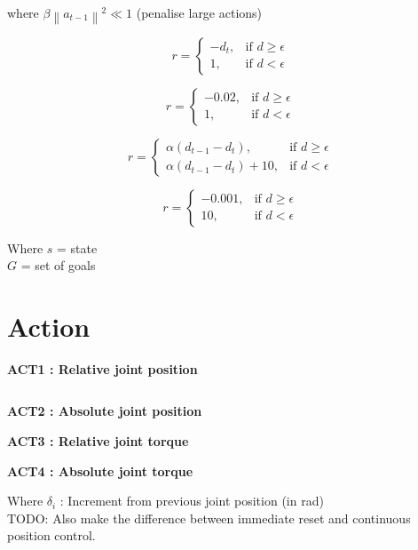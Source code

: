 \documentclass{article}
\newcommand{\norm}[1]{\left\lVert#1\right\rVert}
\begin{document}
where $\beta \norm{a_{t-1}}^2 \ll 1$ (penalise large actions)

\begin{equation}
r = \begin{cases}
    - d_t , & \text{if $d \geq \epsilon $}\\
    1 , & \text{if $d < \epsilon $}
  \end{cases}
\end{equation}

\begin{equation}
r = \begin{cases}
    - 0.02 , & \text{if $d \geq \epsilon $}\\
    1 , & \text{if $d < \epsilon $}
  \end{cases}
\end{equation}

\begin{equation}
r = \begin{cases}
\alpha (d_{t-1} - d_t), & \text{if $d \geq \epsilon $}\\
\alpha (d_{t-1} - d_t) + 10, & \text{if $d < \epsilon $}
  \end{cases}
\end{equation}

\begin{equation}
r = \begin{cases}
    - 0.001 , & \text{if $d \geq \epsilon $}\\
    10 , & \text{if $d < \epsilon $}
  \end{cases}
\end{equation}


Where
$s$ = state \\
$G$ = set of goals \\


\section{Action}


\textbf{ACT1 : Relative joint position}

\begin{equation}
[\delta_1, \delta_2, \delta_3, \delta_4, \delta_5, \delta_6]
\end{equation}

\textbf{ACT2 : Absolute joint position}

\textbf{ACT3 : Relative joint torque}

\textbf{ACT4 : Absolute joint torque}

Where
$\delta_i$ : Increment from previous joint position (in rad) \\

TODO: Also make the difference between immediate reset and continuous position control.
\end{document}
